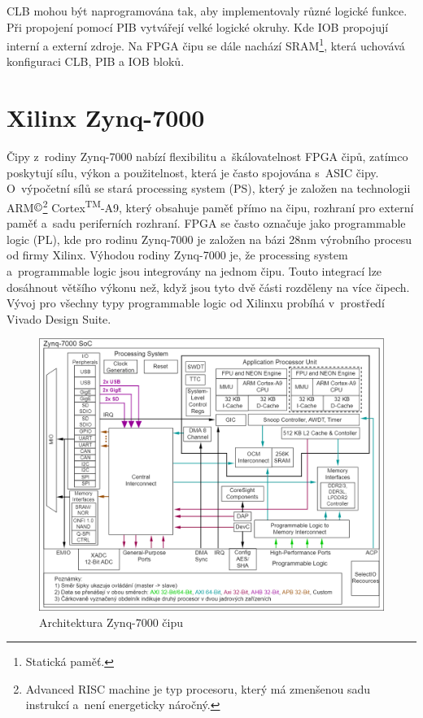 CLB mohou být naprogramována tak, aby implementovaly různé logické funkce. Při propojení pomocí PIB vytvářejí velké logické okruhy. Kde IOB propojují interní a externí zdroje. Na FPGA čipu se dále nachází SRAM\footnote{Statická paměť.\label{foot:sram}}, která uchovává konfiguraci CLB, PIB a IOB bloků.\cite{Sekanina3540403779ISBN}

\setcounter{footnote}{0}
\section{Xilinx Zynq-7000}
Čipy z~rodiny Zynq-7000 nabízí flexibilitu a~škálovatelnost FPGA čipů, zatímco poskytují sílu, výkon a použitelnost, která je často spojována s~ASIC čipy.
O~výpočetní sílů se stará processing system (PS), který je založen na technologii ARM$\copyright$\footnote{Advanced RISC machine je typ procesoru, který má zmenšenou sadu instrukcí a~není energeticky náročný.\label{foot:ARM}} Cortex\textsuperscript{TM}-A9, který obsahuje paměť přímo na čipu, rozhraní pro externí paměť a~sadu periferních rozhraní. FPGA se často označuje jako programmable logic (PL), kde pro rodinu Zynq-7000 je založen na bázi 28nm výrobního procesu od firmy Xilinx. Výhodou rodiny Zynq-7000 je, že processing system a~programmable logic jsou integrovány na jednom čipu. Touto integrací lze dosáhnout většího výkonu než, když jsou tyto dvě části rozděleny na více čipech. Vývoj pro všechny typy programmable logic od Xilinxu probíhá v~prostředí Vivado Design Suite.\cite{Zynq-7000}
\begin{figure}[!h]
  \begin{center}
    \includegraphics[scale=0.4]{obrazky/Zynq-7000-own.png}
  \end{center}
  \caption[Architektura Zynq-7000]{Architektura Zynq-7000 čipu \cite{Zynq-7000}}
  \label{img:Zynq-7000}
\end{figure}
